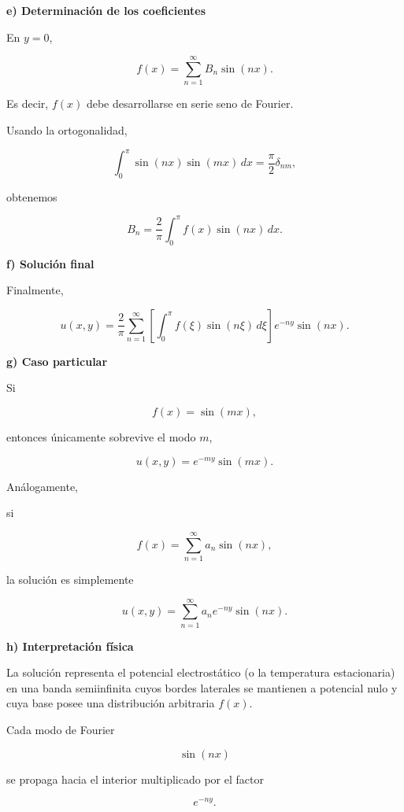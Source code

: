 \documentclass[11pt,spanish]{article}
\begin{document}

{\bf e) Determinación de los coeficientes}

En \(y=0\),

\[
f(x)
=
\sum_{n=1}^{\infty}
B_n\sin(nx).
\]

Es decir, \(f(x)\) debe desarrollarse en serie seno de Fourier.

Usando la ortogonalidad,

\[
\int_0^\pi
\sin(nx)\sin(mx)\,dx
=
\frac{\pi}{2}\delta_{nm},
\]

obtenemos

\[
\boxed{
B_n
=
\frac{2}{\pi}
\int_0^\pi
f(x)\sin(nx)\,dx.
}
\]


{\bf f) Solución final}

Finalmente,

\[
\boxed{
u(x,y)
=
\frac{2}{\pi}
\sum_{n=1}^{\infty}
\left[
\int_0^\pi
f(\xi)\sin(n\xi)\,d\xi
\right]
e^{-ny}
\sin(nx).
}
\]


{\bf g) Caso particular}

Si

\[
f(x)=\sin(mx),
\]

entonces únicamente sobrevive el modo \(m\),

\[
u(x,y)
=
e^{-my}\sin(mx).
\]

Análogamente,

si

\[
f(x)=\sum_{n=1}^{\infty}a_n\sin(nx),
\]

la solución es simplemente

\[
u(x,y)
=
\sum_{n=1}^{\infty}
a_ne^{-ny}\sin(nx).
\]


{\bf h) Interpretación física}

La solución representa el potencial electrostático (o la temperatura
estacionaria) en una banda semiinfinita cuyos bordes laterales se mantienen a
potencial nulo y cuya base posee una distribución arbitraria \(f(x)\).

Cada modo de Fourier

\[
\sin(nx)
\]

se propaga hacia el interior multiplicado por el factor

\[
e^{-ny}.
\]
\end{document}
